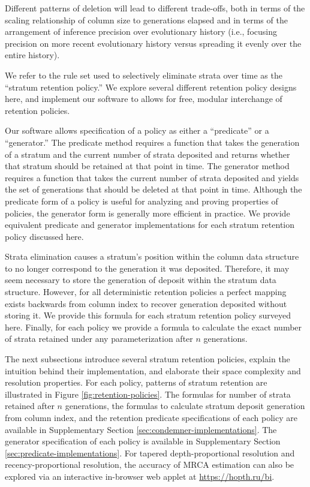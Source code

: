 Different patterns of deletion will lead to different trade-offs, both in terms of the scaling relationship of column size to generations elapsed and in terms of the arrangement of inference precision over evolutionary history (i.e., focusing precision on more recent evolutionary history versus spreading it evenly over the entire history).

We refer to the rule set used to selectively eliminate strata over time as the ``stratum retention policy.''
We explore several different retention policy designs here, and implement our software to allows for free, modular interchange of retention policies.

Our software allows specification of a policy as either a ``predicate'' or a ``generator.''
The predicate method requires a function that takes the generation of a stratum and the current number of strata deposited and returns whether that stratum should be retained at that point in time.
The generator method requires a function that takes the current number of strata deposited and yields the set of generations that should be deleted at that point in time.
Although the predicate form of a policy is useful for analyzing and proving properties of policies, the generator form is generally more efficient in practice.
We provide equivalent predicate and generator implementations for each stratum retention policy discussed here.

Strata elimination causes a stratum's position within the column data structure to no longer correspond to the generation it was deposited.
Therefore, it may seem necessary to store the generation of deposit within the stratum data structure.
However, for all deterministic retention policies a perfect mapping exists backwards from column index to recover generation deposited without storing it.
We provide this formula for each stratum retention policy surveyed here.
Finally, for each policy we provide a formula to calculate the exact number of strata retained under any parameterization after $n$ generations.

The next subsections introduce several stratum retention policies, explain the intuition behind their implementation, and elaborate their space complexity and resolution properties.
For each policy, patterns of stratum retention are illustrated in Figure \ref{fig:retention-policies}.
The formulas for number of strata retained after $n$ generations, the formulas to calculate stratum deposit generation from column index, and the retention predicate specifications of each policy are available in Supplementary Section \ref{sec:condemner-implementations}.
The generator specification of each policy is available in Supplementary Section \ref{sec:predicate-implementations}.
For tapered depth-proportional resolution and recency-proportional resolution, the accuracy of MRCA estimation can also be explored via an interactive in-browser web applet at \url{https://hopth.ru/bi}.

